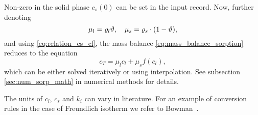 Non-zero  in the solid phase $c_s(0)$ can be set in the input record. 
Now, further denoting \[ \mu_l = \varrho_l \vartheta, \quad \mu_s = \varrho_s\cdot(1-\vartheta), \]
and using \eqref{eq:relation_cs_cl}, the mass balance \eqref{eq:mass_balance_sorption} reduces to the equation
\begin{equation}
 c_T = \mu_l c_l + \mu_s f(c_l),
 \label{eq:nonlin_sorption}
\end{equation}
which can be either solved iteratively or using interpolation. See subsection \ref{sec:num_sorp_math} 
in numerical methods for details.

The units of $c_l$, $c_s$ and $k_i$ can vary in literature. For an example of conversion rules 
in the case of Freundlich isotherm we refer to Bowman~\cite{bowman_conversion_1982}.

% 
% 


